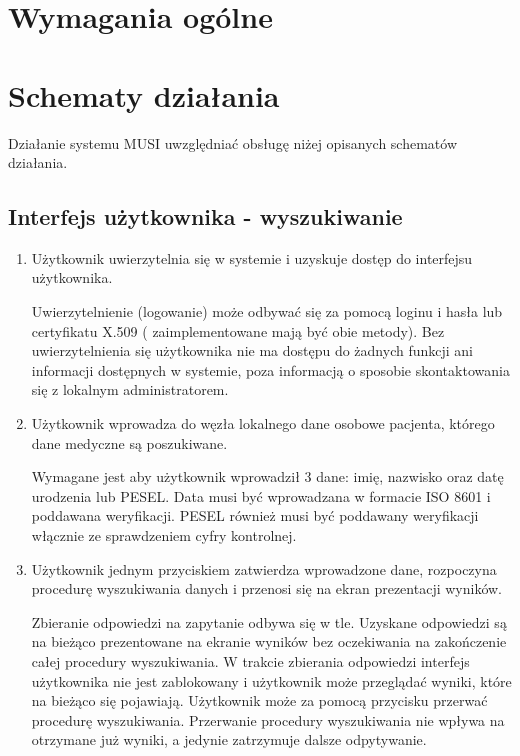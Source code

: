 \documentclass[a4paper]{report}
\begin{document}
\section{Wymagania ogólne}

\section{Schematy działania}

Działanie systemu MUSI uwzględniać obsługę niżej opisanych schematów działania.

\subsection{Interfejs użytkownika - wyszukiwanie}
\begin{enumerate}
  \item Użytkownik uwierzytelnia się w systemie i uzyskuje dostęp do interfejsu użytkownika.

    Uwierzytelnienie (logowanie) może odbywać się za pomocą loginu i hasła lub certyfikatu X.509 (
    zaimplementowane mają być obie metody). Bez uwierzytelnienia się użytkownika nie ma dostępu do
    żadnych funkcji ani informacji dostępnych w systemie, poza informacją o sposobie skontaktowania
    się z lokalnym administratorem.

  \item Użytkownik wprowadza do węzła lokalnego dane osobowe pacjenta, którego dane medyczne są poszukiwane.

        Wymagane jest aby użytkownik wprowadził 3 dane: imię, nazwisko oraz datę urodzenia lub PESEL.
        Data musi być wprowadzana w formacie ISO 8601 i poddawana weryfikacji. PESEL również musi być
        poddawany weryfikacji włącznie ze sprawdzeniem cyfry kontrolnej.
  
  \item Użytkownik jednym przyciskiem zatwierdza wprowadzone dane, rozpoczyna procedurę wyszukiwania danych i przenosi
  się na ekran prezentacji wyników.

        Zbieranie odpowiedzi na zapytanie odbywa się w tle. Uzyskane odpowiedzi są na bieżąco prezentowane na
        ekranie wyników bez oczekiwania na zakończenie całej procedury wyszukiwania. W trakcie zbierania odpowiedzi
        interfejs użytkownika nie jest zablokowany i użytkownik może przeglądać wyniki, które na bieżąco się pojawiają.
        Użytkownik może za pomocą przycisku przerwać procedurę wyszukiwania. Przerwanie procedury wyszukiwania
        nie wpływa na otrzymane już wyniki, a jedynie zatrzymuje dalsze odpytywanie.
  
\end{enumerate}
\end{document}

